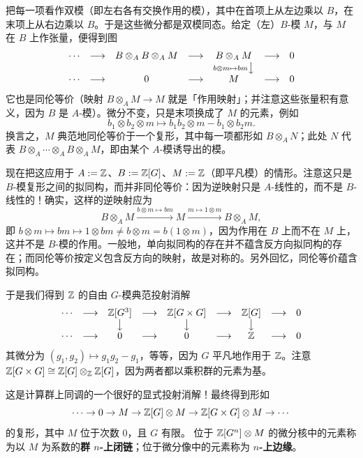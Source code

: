 把每一项看作双模（即左右各有交换作用的模），其中在首项上从左边乘以 $B$，在末项上从右边乘以 $B$。于是这些微分都是双模同态。给定（左）$B$-模 $M$，与 $M$ 在 $B$ 上作张量，便得到图
\[
\begin{array}{ccccccc}
\cdots & \longrightarrow & B\otimes_AB\otimes_AM & \longrightarrow & B\otimes_AM & \longrightarrow & 0\\
& & & & {\scriptstyle b\otimes m\mapsto bm}\big\downarrow & & \\
\cdots & \longrightarrow & 0 & \longrightarrow & M & \longrightarrow & 0
\end{array}
\]
它也是同伦等价（映射 $B\otimes_AM\to M$ 就是「作用映射」；并注意这些张量积有意义，因为 $B$ 是 $A$-模）。微分不变，只是末项换成了 $M$ 的元素，例如
\[
b_1\otimes b_2\otimes m\mapsto b_1b_2\otimes m-b_1\otimes b_2m.
\]
换言之，$M$ 典范地同伦等价于一个复形，其中每一项都形如 $B\otimes_AN$；此处 $N$ 代表 $B\otimes_A\cdots\otimes_AB\otimes_AM$，即由某个 $A$-模诱导出的模。

现在把这应用于 $A:=\mathbb{Z}$、$B:=\mathbb{Z}[G]$、$M:=\mathbb{Z}$（即平凡模）的情形。注意这只是 $B$-模复形之间的拟同构，而并非同伦等价：因为逆映射只是 $A$-线性的，而不是 $B$-线性的！确实，这样的逆映射应为
\[
B\otimes_AM\xrightarrow{b\otimes m\mapsto bm}M\xrightarrow{m\mapsto1\otimes m}B\otimes_AM,
\]
即 $b\otimes m\mapsto bm\mapsto1\otimes bm\neq b\otimes m=b(1\otimes m)$，因为作用在 $B$ 上而不在 $M$ 上，这并不是 $B$-模的作用。一般地，单向拟同构的存在并不蕴含反方向拟同构的存在；而同伦等价按定义包含反方向的映射，故是对称的。另外回忆，同伦等价蕴含拟同构。

于是我们得到 $\mathbb{Z}$ 的自由 $G$-模典范投射消解
\[
\begin{array}{ccccccccc}
\cdots & \longrightarrow & \mathbb{Z}[G^3] & \longrightarrow & \mathbb{Z}[G\times G] & \longrightarrow & \mathbb{Z}[G] & \longrightarrow & 0\\
& & \big\downarrow & & \big\downarrow & & \big\downarrow & & \\
\cdots & \longrightarrow & 0 & \longrightarrow & 0 & \longrightarrow & \mathbb{Z} & \longrightarrow & 0
\end{array}
\]
其微分为 $(g_1,g_2)\mapsto g_1g_2-g_1$，等等，因为 $G$ 平凡地作用于 $\mathbb{Z}$。注意 $\mathbb{Z}[G\times G]\cong\mathbb{Z}[G]\otimes_{\mathbb{Z}}\mathbb{Z}[G]$，因为两者都以乘积群的元素为基。

这是计算群上同调的一个很好的显式投射消解！最终得到形如
\[
\cdots\to0\to M\to\mathbb{Z}[G]\otimes M\to\mathbb{Z}[G\times G]\otimes M\to\cdots
\]
的复形，其中 $M$ 位于次数 $0$，且 $G$ 有限。
位于 $\mathbb{Z}[G^n]\otimes M$ 的微分核中的元素称为以 $M$ 为系数的\textbf{群 $n$-上闭链}；位于微分像中的元素称为 \textbf{$n$-上边缘}。
